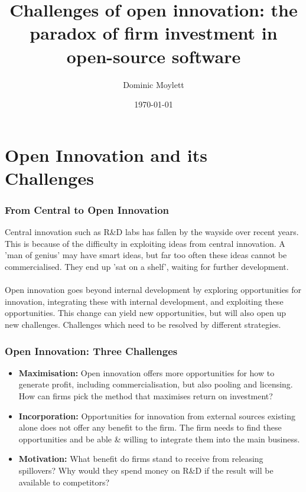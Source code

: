 \documentclass{beamer}
\title[Challenges of open innovation]{Challenges of open innovation: the paradox of firm investment in open-source software} %
\author{Dominic Moylett} %
\institute[University of Bristol] %
{
University of Bristol \\ %
\medskip
\textit{dominic.moylett.2011@my.bristol.ac.uk} %
}
\date{\today} %
\begin{document}
\begin{frame}
\titlepage %
\end{frame}


\section{Open Innovation and its Challenges}

\begin{frame}
\frametitle{From Central to Open Innovation}
Central innovation such as R\&D labs has fallen by the wayside over recent years. This is because of the difficulty in exploiting ideas from central innovation. A 'man of genius' may have smart ideas, but far too often these ideas cannot be commercialised. They end up 'sat on a shelf', waiting for further development.\\~\\

Open innovation goes beyond internal development by exploring opportunities for innovation, integrating these with internal development, and exploiting these opportunities. This change can yield new opportunities, but will also open up new challenges. Challenges which need to be resolved by different strategies.
\end{frame}


\begin{frame}
\frametitle{Open Innovation: Three Challenges}
\begin{itemize}
\item \textbf{Maximisation:} Open innovation offers more opportunities for how to generate profit, including commercialisation, but also pooling and licensing. How can firms pick the method that maximises return on investment?
\item \textbf{Incorporation:} Opportunities for innovation from external sources existing alone does not offer any benefit to the firm. The firm needs to find these opportunities and be able \& willing to integrate them into the main business.
\item \textbf{Motivation:} What benefit do firms stand to receive from releasing spillovers? Why would they spend money on R\&D if the result will be available to competitors?
\end{itemize}
\end{frame}
\end{document}
